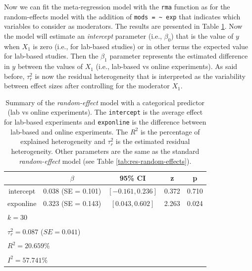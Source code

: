 \documentclass[
  man,floatsintext]{apa6}
\begin{document}
\normalsize

Now we can fit the meta-regression model with the \texttt{rma} function as for the random-effects model with the addition of \texttt{mods\ =\ \textasciitilde{}\ exp} that indicates which variables to consider as moderators. The results are presented in Table \ref{tab:res-meta-reg-dummy}. Now the model will estimate an \emph{intercept} parameter (i.e., \(\beta_0\)) that is the value of \(y\) when \(X_1\) is zero (i.e., for lab-based studies) or in other terms the expected value for lab-based studies. Then the \(\beta_1\) parameter represents the estimated difference in \(y\) between the values of \(X_1\) (i.e., lab-based vs online experiments). As said before, \(\tau^2_r\) is now the residual heterogeneity that is interpreted as the variability between effect sizes after controlling for the moderator \(X_1\).

\scriptsize

\begin{table}[H]

\caption{\label{tab:res-meta-reg-dummy}Summary of the \emph{random-effect} model with a categorical predictor (lab vs online experiments). The \texttt{intercept} is the average effect for lab-based experiments and \texttt{exponline} is the difference between lab-based and online experiments. The \(R^2\) is the percentage of explained heterogeneity and \(\tau^2_r\) is the estimated residual heterogeneity. Other parameters are the same as the standard \emph{random-effect} model (see Table \ref{tab:res-random-effects}).}
\centering
\fontsize{9}{11}\selectfont
\begin{tabular}[t]{ccccc}
\toprule
 & $\beta$ & 95\% CI & z & p\\
\midrule
intercept & 0.038 (SE = 0.101) & $[-0.161, 0.236]$ & 0.372 & 0.710\\
exponline & 0.323 (SE = 0.143) & $[0.043, 0.602]$ & 2.263 & 0.024\\
\bottomrule
\multicolumn{5}{l}{\textsuperscript{} $k = 30$}\\
\multicolumn{5}{l}{\textsuperscript{} $\tau^2_r = 0.087$ ($SE = 0.041$)}\\
\multicolumn{5}{l}{\textsuperscript{} $R^2 = 20.659\%$}\\
\multicolumn{5}{l}{\textsuperscript{} $I^2 = 57.741\%$}\\
\end{tabular}
\end{table}

\normalsize
\end{document}
